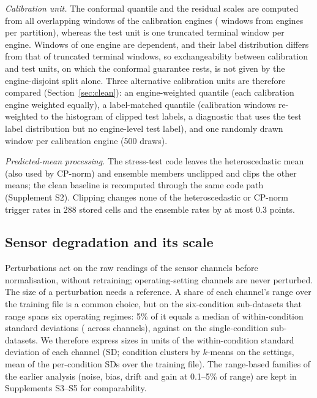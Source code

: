 \documentclass[11pt,a4paper]{article}
\newcommand{\JClipRateMaxEns}{0.3}
\newcommand{\JClipRateN}{288}
\begin{document}
\emph{Calibration unit.} The conformal quantile and the residual scales are computed from all overlapping windows of the calibration engines (\RVCalWin{} windows from \RVCalEng{} engines per partition), whereas the test unit is one truncated terminal window per engine. Windows of one engine are dependent, and their label distribution differs from that of truncated terminal windows, so exchangeability between calibration and test units, on which the conformal guarantee rests,\cite{barber2023} is not given by the engine-disjoint split alone. Three alternative calibration units are therefore compared (Section~\ref{sec:clean}): an engine-weighted quantile (each calibration engine weighted equally), a label-matched quantile (calibration windows re-weighted to the histogram of clipped test labels, a diagnostic that uses the test label distribution but no engine-level test label), and one randomly drawn window per calibration engine (500 draws).

\emph{Predicted-mean processing.} The stress-test code leaves the heteroscedastic mean (also used by CP-norm) and ensemble members unclipped and clips the other means; the clean baseline is recomputed through the same code path (Supplement S2). Clipping changes none of the heteroscedastic or CP-norm trigger rates in \JClipRateN{} stored cells and the ensemble rates by at most \JClipRateMaxEns{} points.

\subsection{Sensor degradation and its scale}\label{sec:pert}
Perturbations act on the raw readings of the sensor channels before normalisation, without retraining; operating-setting channels are never perturbed. The size of a perturbation needs a reference. A share of each channel's range over the training file is a common choice, but on the six-condition sub-datasets that range spans six operating regimes: 5\% of it equals a median of \RVRatioSix{} within-condition standard deviations (\RVRatioSixRange{} across channels), against \RVRatioSingle{} on the single-condition sub-datasets. We therefore express sizes in units of the within-condition standard deviation of each channel (SD; condition clusters by $k$-means on the settings, mean of the per-condition SDs over the training file). The range-based families of the earlier analysis (noise, bias, drift and gain at 0.1--5\% of range) are kept in Supplements S3--S5 for comparability.
\end{document}
